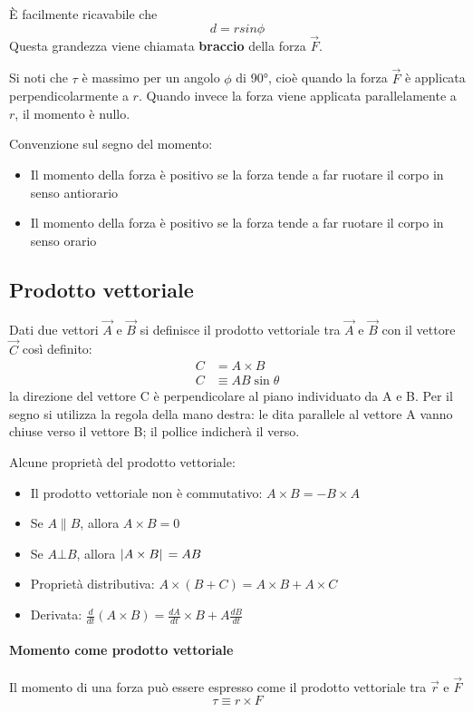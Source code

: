 \documentclass[a4paper,11pt,oneside]{book}
\begin{document}
È facilmente ricavabile che 
\begin{equation*}
    d = r sin \phi
\end{equation*}
Questa grandezza viene chiamata \textbf{braccio} della forza $\vec{F}$.

Si noti che $\tau$ è massimo per un angolo $\phi$ di 90°, cioè quando la forza $\vec{F}$ è applicata perpendicolarmente a $r$. Quando invece la forza viene applicata
parallelamente a $r$, il momento è nullo.

Convenzione sul segno del momento:
\begin{itemize}
    \item Il momento della forza è positivo se la forza tende a far ruotare il corpo in senso antiorario
    \item Il momento della forza è positivo se la forza tende a far ruotare il corpo in senso orario
\end{itemize}

\subsection{Prodotto vettoriale}
Dati due vettori $\vec{A}$ e $\vec{B}$ si definisce il prodotto vettoriale tra $\vec{A}$ e $\vec{B}$ con il vettore $\vec{C}$ così definito:
\begin{align*}
    C &= A \times B \\
    C &\equiv AB \sin{\theta}
\end{align*}
la direzione del vettore C è perpendicolare al piano individuato da A e B. Per il segno si utilizza la regola della mano destra: le dita parallele al vettore A vanno chiuse verso il vettore B; il pollice indicherà il verso.

Alcune proprietà del prodotto vettoriale:
\begin{itemize}
    \item Il prodotto vettoriale non è commutativo: $A \times B = -B \times A$
    \item Se $A \parallel B$, allora $A \times B = 0$
    \item Se $A \bot B$, allora $\abs*{A \times B} = AB$
    \item Proprietà distributiva: $A \times (B + C) = A \times B + A \times C$
    \item Derivata: $\tfrac{d}{dt}(A \times B) = \tfrac{dA}{dt} \times B + A \tfrac{dB}{dt}$
\end{itemize}

\paragraph{Momento come prodotto vettoriale}
Il momento di una forza può essere espresso come il prodotto vettoriale tra $\vec{r}$ e $\vec{F}$
\begin{equation*}
    \tau \equiv r \times F
\end{equation*}
\end{document}
